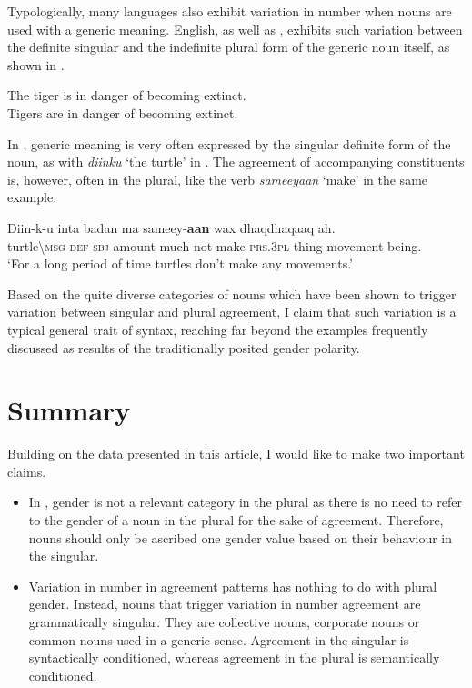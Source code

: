 \documentclass[output=paper]{langsci/langscibook}
\begin{document}
Typologically, many languages also exhibit variation in number when nouns are used with a generic meaning. English, as well as , exhibits such variation between the definite singular and the indefinite plural form of the generic noun itself, as shown in .

\ea\label{ex:nilsson:10}  
 \ea  The tiger is in danger of becoming extinct.\\
 \ex  Tigers are in danger of becoming extinct.\\
\z
\z


In , generic meaning is very often expressed by the singular definite form of the noun, as with \textit{diinku} ‘the turtle’ in . The agreement of accompanying constituents is, however, often in the plural, like the verb \textit{sameeyaan} ‘make’ in the same example.

\ea\label{ex:nilsson:11}
\gll Diin-k-u    inta  badan  ma  sameey-\textbf{aan}  wax  dhaqdhaqaaq  ah.\\
     turtle{\textbackslash}\textsc{msg-def-sbj}  amount  much  not  make-\textsc{prs.3pl}  thing  movement  being.\\
\glt ‘For a long period of time turtles don’t make any movements.’
\z

Based on the quite diverse categories of nouns which have been shown to trigger variation between singular and plural agreement, I claim that such variation is a typical general trait of  syntax, reaching far beyond the examples frequently discussed as results of the traditionally posited gender polarity.  

\section{Summary}\label{sec:nilsson:4}

Building on the data presented in this article, I would like to make two important claims. 


\begin{itemize}[noitemsep]
\item In , gender is not a relevant category in the plural as there is no need to refer to the gender of a noun in the plural for the sake of agreement. Therefore, nouns should only be ascribed one gender value based on their behaviour in the singular. 

\item Variation in number in agreement patterns has nothing to do with plural gender. Instead, nouns that trigger variation in number agreement are grammatically singular. They are collective nouns, corporate nouns or common nouns used in a generic sense. Agreement in the singular is syntactically conditioned, whereas agreement in the plural is semantically conditioned.

\end{itemize}
\end{document}
